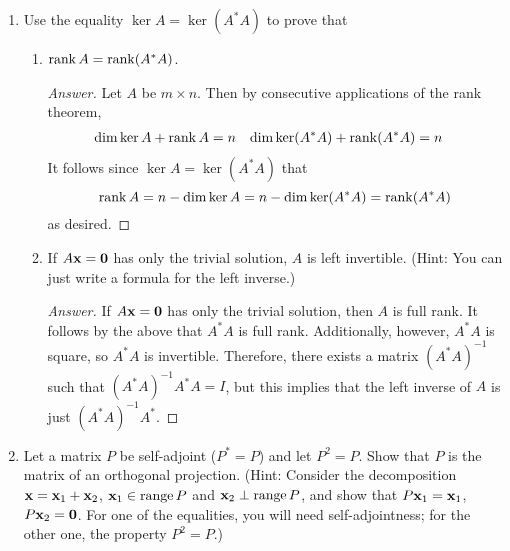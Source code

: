 \documentclass[../psets.tex]{subfiles}
\begin{document}
\begin{enumerate}[label={\textbf{5.\arabic*.}}]
    \begin{proof}[Answer]
        Suppose $\x\in\ker A$. Then $A\x=\bm{0}$. It follows that $A^*A\x=A^*\bm{0}=\bm{0}$, so $\x\in\ker(A^*A)$, as desired.\par
        Now suppose that $\x\in\ker(A^*A)$. Then $A^*A\x=\bm{0}$. It follows that
        \begin{equation*}
            0 = (\bm{0},\x) = (A^*A\x,\x) = (A\x,A\x) = \norm{A\x}^2
        \end{equation*}
        But this implies that $A\x=0$, so $\x\in\ker A$, as desired.
    \end{proof}
    \item Use the equality $\ker A=\ker(A^*A)$ to prove that
    \begin{enumerate}
        \item $\rank A=\rank(A^*A)$.
        \begin{proof}[Answer]
            Let $A$ be $m\times n$. Then by consecutive applications of the rank theorem,
            \begin{align*}
                \dim\ker A+\rank A &= n&
                \dim\ker(A^*A)+\rank(A^*A) &= n
            \end{align*}
            It follows since $\ker A=\ker(A^*A)$ that
            \begin{equation*}
                \rank A = n-\dim\ker A = n-\dim\ker(A^*A) = \rank(A^*A)
            \end{equation*}
            as desired.
        \end{proof}
        \item If $A\x=\bm{0}$ has only the trivial solution, $A$ is left invertible. (Hint: You can just write a formula for the left inverse.)
        \begin{proof}[Answer]
            If $A\x=\bm{0}$ has only the trivial solution, then $A$ is full rank. It follows by the above that $A^*A$ is full rank. Additionally, however, $A^*A$ is square, so $A^*A$ is invertible. Therefore, there exists a matrix $(A^*A)^{-1}$ such that $(A^*A)^{-1}A^*A=I$, but this implies that the left inverse of $A$ is just $(A^*A)^{-1}A^*$.
        \end{proof}
    \end{enumerate}
    \item Let a matrix $P$ be self-adjoint ($P^*=P$) and let $P^2=P$. Show that $P$ is the matrix of an orthogonal projection. (Hint: Consider the decomposition $\mathbf{x}=\mathbf{x}_1+\mathbf{x}_2$, $\mathbf{x}_1\in\operatorname{range} P$ and $\mathbf{x}_2\perp\operatorname{range} P$, and show that $P\mathbf{x}_1=\mathbf{x}_1$, $P\mathbf{x}_2=\bm{0}$. For one of the equalities, you will need self-adjointness; for the other one, the property $P^2=P$.)

\end{enumerate}
\end{document}
